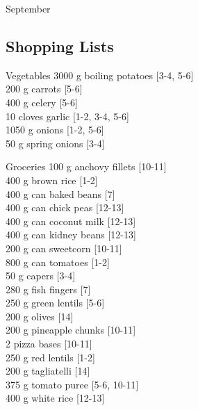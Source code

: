 \begin{menu}{September}
    \subsection*{Shopping Lists}
      \begin{shoppinglist}{Vegetables}
      3000 g boiling potatoes {\scriptsize[3-4, 5-6]}\\
      200 g carrots {\scriptsize[5-6]}\\
      400 g celery {\scriptsize[5-6]}\\
      10 cloves garlic {\scriptsize[1-2, 3-4, 5-6]}\\
      1050 g onions {\scriptsize[1-2, 5-6]}\\
      50 g spring onions {\scriptsize[3-4]}\\
      \end{shoppinglist}%
      \begin{shoppinglist}{Groceries}
      100 g anchovy fillets {\scriptsize[10-11]}\\
      400 g brown rice {\scriptsize[1-2]}\\
      400 g can baked beans {\scriptsize[7]}\\
      400 g can chick peas {\scriptsize[12-13]}\\
      400 g can coconut milk {\scriptsize[12-13]}\\
      400 g can kidney beans {\scriptsize[12-13]}\\
      200 g can sweetcorn {\scriptsize[10-11]}\\
      800 g can tomatoes {\scriptsize[1-2]}\\
      50 g capers {\scriptsize[3-4]}\\
      280 g fish fingers {\scriptsize[7]}\\
      250 g green lentils {\scriptsize[5-6]}\\
      200 g olives {\scriptsize[14]}\\
      200 g pineapple chunks {\scriptsize[10-11]}\\
      2  pizza bases {\scriptsize[10-11]}\\
      250 g red lentils {\scriptsize[1-2]}\\
      200 g tagliatelli {\scriptsize[14]}\\
      375 g tomato puree {\scriptsize[5-6, 10-11]}\\
      400 g white rice {\scriptsize[12-13]}\\
      \end{shoppinglist}%

\end{menu}
